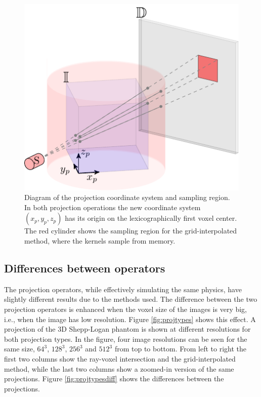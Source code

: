 \begin{figure}
\begin{center}

\includegraphics{GPUmethods/projcoord-figure0.pdf} 
\end{center}

\caption[Projection coordinate system]{\label{fig:projcoord} Diagram of the projection coordinate system and sampling region. In both projection operations the new coordinate system $(x_p,y_p,z_p)$ has its origin on the lexicographically first voxel center. The red cylinder shows the sampling region for the grid-interpolated method, where the kernels sample from memory.} 
\end{figure}
\subsection{Differences between operators}

The projection operators, while effectively simulating the same physics, have slightly different results due to the methods used. The difference between the two projection operators is enhanced when the voxel size of the images is very big, i.e., when the image has low resolution. Figure \ref{fig:projtypes} shows this effect. A projection of the 3D Shepp-Logan phantom is shown at different resolutions for both projection types. In the figure, four image resolutions can be seen for the same size, $64^3$, $128^3$, $256^3$ and $512^3$ from top to bottom. From left to right the first two columns show the ray-voxel intersection and the grid-interpolated method, while the last two columns show a zoomed-in version of the same projections. Figure \ref{fig:projtypesdiff} shows the differences between the projections.

